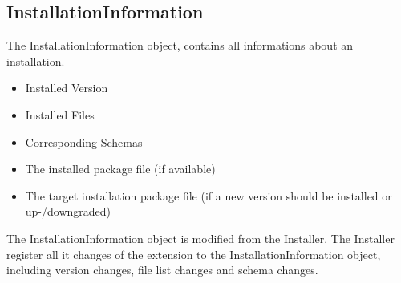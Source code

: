 \subsection[sec:installerinformation]{InstallationInformation}

The InstallationInformation object, contains all informations about an installation.

\begin{itemize}
\item Installed Version
\item Installed Files
\item Corresponding Schemas
\item The installed package file (if available)
\item The target installation package file (if a new version should be installed or up-/downgraded)
\end{itemize}

The InstallationInformation object is modified from the Installer.
The Installer register all it changes of the extension to the InstallationInformation object, including version changes, file list changes and schema changes.
